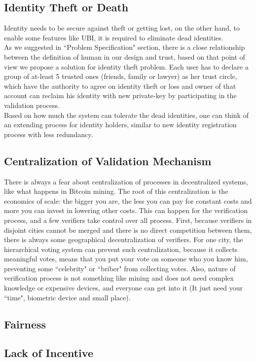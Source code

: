 \documentclass[conference]{IEEEtran}
\begin{document}
\subsection{Identity Theft or Death}
Identity needs to be secure against theft or getting lost, on the other hand, to enable some features like UBI, it is required to eliminate dead identities.\\
As we suggested in ``Problem Specification" section, there is a close relationship between the definition of human in our design and trust, based on that point of view we propose a solution for identity theft problem. Each user has to declare a group of at-least 5 trusted ones (friends, family or lawyer) as her trust circle, which have the authority to agree on identity theft or loss and owner of that account can reclaim his identity with new private-key by participating in the validation process.\\
Based on how much the system can tolerate the dead identities, one can think of an extending process for identity holders, similar to new identity registration process with less redundancy.
\subsection{Centralization of Validation Mechanism}
There is always a fear about centralization of processes in decentralized systems, like what happens in Bitcoin mining. The root of this centralization is the economics of scale: the bigger you are, the less you can pay for constant costs and more you can invest in lowering other costs. This can happen for the verification process, and a few verifiers take control over all process. First, because verifiers in disjoint cities cannot be merged and there is no direct competition between them, there is always some geographical decentralization of verifiers. For one city, the hierarchical voting system can prevent such centralization, because it collects meaningful votes, means that you put your vote on someone who you know him, preventing some ``celebrity" or ``briber" from collecting votes. Also, nature of verification process is not something like mining and does not need complex knowledge or expensive devices, and everyone can get into it (It just need your ``time", biometric device and small place). 

\subsection{Fairness}
\subsection{Lack of Incentive}
\end{document}
